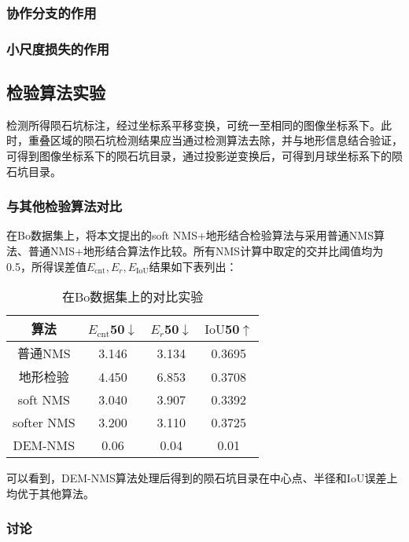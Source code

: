 \subsubsection{协作分支的作用}

\subsubsection{小尺度损失的作用}

\subsection{检验算法实验}
检测所得陨石坑标注，经过坐标系平移变换，可统一至相同的图像坐标系下。此时，重叠区域的陨石坑检测结果应当通过检测算法去除，并与地形信息结合验证，可得到图像坐标系下的陨石坑目录，通过投影逆变换后，可得到月球坐标系下的陨石坑目录。
\subsubsection{与其他检验算法对比}
在Bo\cite{boCatalogueMeterscaleImpact2022}数据集上，将本文提出的soft NMS+地形结合检验算法与采用普通NMS算法、普通NMS+地形结合算法作比较。所有NMS计算中取定的交并比阈值均为0.5，所得误差值$E_\mathrm{cnt},E_r,E_\mathrm{IoU}$结果如下表列出：
\begin{table}[H]
  \begin{center}
  \caption{在Bo\cite{boCatalogueMeterscaleImpact2022}数据集上的对比实验}
  \label{tab:verify-comp}
  \begin{tabular}{ c  c  c  c }
  \toprule
  算法 & $E_\mathrm{cnt}$\@50$\downarrow$ & $E_r$\@50$\downarrow$ & $\mathrm{IoU}$\@50$\uparrow$ \\
  \hline
  普通NMS & 3.146 & 3.134 & 0.3695 \\
  地形检验 & 4.450 & 6.853 & 0.3708 \\
  soft NMS & 3.040 & 3.907 & 0.3392 \\
  softer NMS & 3.200 & 3.110 & 0.3725\\
  DEM-NMS & 0.06 & 0.04 & 0.01 \\
  \bottomrule 
  \end{tabular}
  \end{center}
\end{table}\par
可以看到，DEM-NMS算法处理后得到的陨石坑目录在中心点、半径和IoU误差上均优于其他算法。
\subsubsection{讨论}
